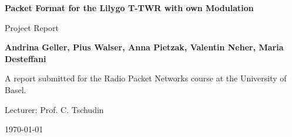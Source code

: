 \begin{titlepage}

    \begin{center}
        \vspace*{1cm}

        \Huge
        \textbf{Packet Format for the Lilygo T-TWR with own Modulation}
        
        \vspace{0.5cm}
        
        \LARGE
        Project Report
        
        \vspace{1.5cm}
        
        \textbf{Andrina Geller, Pius Walser, Anna Pietzak, Valentin Neher, Maria Desteffani}

        \vspace{1.5cm}
        
        \vfill

        \Large
        A report submitted for the Radio Packet Networks course at the University of Basel.

        Lecturer: Prof. C. Tschudin

        \vspace{0.5cm}
        
        \today
        
    \end{center}
    
\end{titlepage}